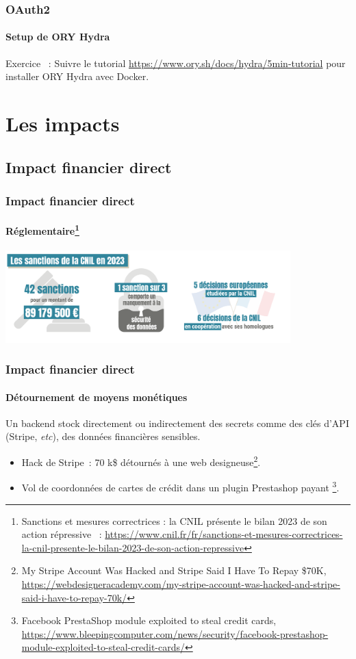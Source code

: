 \documentclass{beamer}
\begin{document}
    \begin{frame}
        \frametitle{OAuth2}
        \framesubtitle{Setup de ORY Hydra}
        \transdissolve
        Exercice \execcounterdispinc{}~:
        Suivre le tutorial \url{https://www.ory.sh/docs/hydra/5min-tutorial} pour installer ORY Hydra avec Docker.
    \end{frame}

    \section{Les impacts}\label{sec:les-impacts}

    \subsection{Impact financier direct}\label{subsec:impact-financier-direct}
    \begin{frame}
        \frametitle{Impact financier direct}
        \framesubtitle{Réglementaire\footnote{Sanctions et mesures correctrices : la CNIL présente le bilan 2023 de son action répressive ~: \url{https://www.cnil.fr/fr/sanctions-et-mesures-correctrices-la-cnil-presente-le-bilan-2023-de-son-action-repressive}}}
        \transdissolve
        \centering
        \includegraphics[width=11cm]{image/sanctions-cnil-2023}
    \end{frame}

    \begin{frame}
        \frametitle{Impact financier direct}
        \framesubtitle{Détournement de moyens monétiques}
        \transdissolve
        Un backend stock directement ou indirectement des secrets comme des clés d'API (Stripe, \textit{etc}), des données financières sensibles.
        \begin{itemize}
            \item Hack de Stripe~: 70 k\$ détournés à une web designeuse\footnote{My Stripe Account Was Hacked and Stripe Said I Have To Repay \$70K, \url{https://webdesigneracademy.com/my-stripe-account-was-hacked-and-stripe-said-i-have-to-repay-70k/}}.
            \item Vol de coordonnées de cartes de crédit dans un plugin Prestashop payant \footnote{Facebook PrestaShop module exploited to steal credit cards, \url{https://www.bleepingcomputer.com/news/security/facebook-prestashop-module-exploited-to-steal-credit-cards/}}.
        \end{itemize}
    \end{frame}
\end{document}
